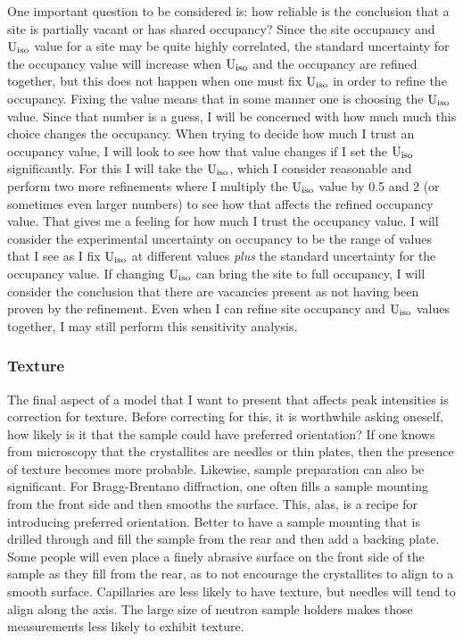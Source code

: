 One important question to be considered is: how reliable is the conclusion that a site is partially vacant or has shared occupancy? Since the site occupancy and $\rm U_{iso}$ value for a site may be quite highly correlated, the standard uncertainty for the occupancy value will increase when  $\rm U_{iso}$ and the occupancy are refined together, but this does not happen when one must fix  $\rm U_{iso}$ in order to refine the occupancy. Fixing the value means that in some manner one is choosing the $\rm U_{iso}$ value. Since that number is a guess, I will be concerned with how much much this choice  changes the occupancy. When trying to decide how much I trust an occupancy value, I will look to see how that value changes if I set the $\rm U_{iso}$ significantly. For this I will take the $\rm U_{iso}$, which I consider reasonable and perform two more refinements where I multiply the $\rm U_{iso}$ value by 0.5 and 2 (or sometimes even larger numbers) to see how that affects the refined occupancy value. That gives me a feeling for how much I trust the occupancy value. I will consider the experimental uncertainty on occupancy to be the range of values that I see as I fix  $\rm U_{iso}$ at different values \textit{plus} the standard uncertainty for the occupancy value. If changing $\rm U_{iso}$ can bring the site to full occupancy, I will consider the conclusion that there are vacancies present as not having been proven by the refinement. Even when I can refine site occupancy and $\rm U_{iso}$ values together, I may still perform this sensitivity analysis.

\subsubsection{Texture}
The final aspect of a model that I want to present that affects peak intensities is correction for texture. Before correcting for this, it is worthwhile asking oneself, how likely is it that the sample could have preferred orientation? If one knows from microscopy that the crystallites are needles or thin plates, then the presence of texture becomes more probable. Likewise, sample preparation can also be significant. For Bragg-Brentano diffraction, one often fills a sample mounting from the front side and then smooths the surface. This, alas, is a recipe for introducing preferred orientation. Better to have a sample mounting that is drilled through and fill the sample from the rear and then add a backing plate. Some people will even place a finely abrasive surface on the front side of the sample as they fill from the rear, as to not encourage the crystallites to align to a smooth surface. Capillaries are less likely to have texture, but needles will tend to align along the axis. The large size of neutron sample holders makes those measurements less likely to exhibit texture. 

